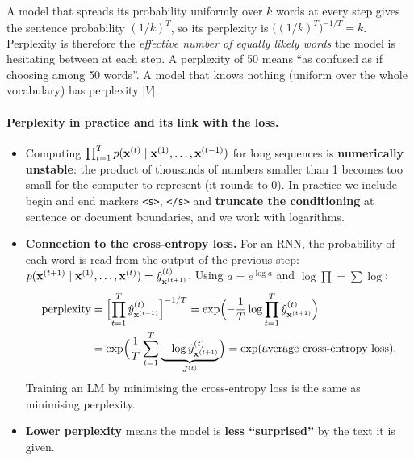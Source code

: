\begin{nbintuition}
\notinslides
A model that spreads its probability uniformly over $k$ words at every step gives the
sentence probability $(1/k)^T$, so its perplexity is
$\bigl((1/k)^T\bigr)^{-1/T} = k$. Perplexity is therefore the \emph{effective number of
equally likely words} the model is hesitating between at each step. A perplexity of 50
means ``as confused as if choosing among 50 words''. A model that knows nothing
(uniform over the whole vocabulary) has perplexity $|V|$.
\end{nbintuition}

\paragraph{Perplexity in practice and its link with the loss.}
\begin{itemize}[nosep]
  \item Computing $\prod_{t=1}^{T} p(\mathbf{x}^{(t)} \mid \mathbf{x}^{(1)}, \ldots,
        \mathbf{x}^{(t-1)})$ for long sequences is \textbf{numerically unstable}: the
        product of thousands of numbers smaller than 1 becomes too small for the
        computer to represent (it rounds to 0). In practice we include begin and end
        markers \texttt{<s>}, \texttt{</s>} and \textbf{truncate the conditioning} at
        sentence or document boundaries, and we work with logarithms.
  \item \textbf{Connection to the cross-entropy loss.} For an RNN, the probability of
        each word is read from the output of the previous step:
        $p(\mathbf{x}^{(t+1)} \mid \mathbf{x}^{(1)}, \ldots, \mathbf{x}^{(t)}) =
        \hat y^{(t)}_{\mathbf{x}^{(t+1)}}$. Using $a = e^{\log a}$ and
        $\log \prod = \sum \log$:
        \begin{align*}
          \text{perplexity}
          &= \Bigl[\prod_{t=1}^{T} \hat y^{(t)}_{\mathbf{x}^{(t+1)}}\Bigr]^{-1/T}
           = \exp\Bigl( -\frac1T \log \prod_{t=1}^{T} \hat y^{(t)}_{\mathbf{x}^{(t+1)}} \Bigr)\\
          &= \exp\Bigl( \frac1T \sum_{t=1}^{T}
             \underbrace{-\log \hat y^{(t)}_{\mathbf{x}^{(t+1)}}}_{J^{(t)}} \Bigr)
           = \exp(\text{average cross-entropy loss}) .
        \end{align*}
        Training an LM by minimising the cross-entropy loss is the same as minimising
        perplexity.
  \item \textbf{Lower perplexity} means the model is \textbf{less ``surprised''} by the
        text it is given.
\end{itemize}

